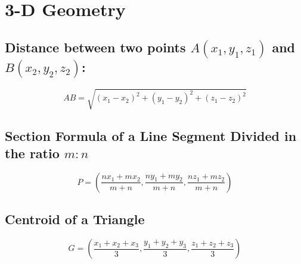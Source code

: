 \large{\chapter{3-D Geometry}}
\section{Distance between two points $A(x_1,y_1,z_1)$ and $B(x_2,y_2,z_2)$:\newline}
\begin{equation}
	AB=\sqrt{(x_1-x_2)^2+(y_1-y_2)^2+(z_1-z_2)^2}
\end{equation}

\section{Section Formula of a Line Segment Divided in the ratio $m:n$\newline}
\begin{equation}
	P=\left(\dfrac{nx_1+mx_2}{m+n},\dfrac{ny_1+my_2}{m+n},\dfrac{nz_1+mz_2}{m+n}\right)
\end{equation}

\section{Centroid of a Triangle\newline}
\begin{equation}
	G=\left(\dfrac{x_1+x_2+x_3}{3},\dfrac{y_1+y_2+y_3}{3},\dfrac{z_1+z_2+z_3}{3}\right)
\end{equation}
